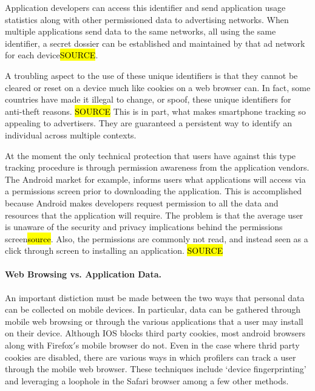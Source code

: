 Application developers can access this identifier and send application usage statistics along with other permissioned data to advertising networks. When multiple applications send data to the same networks, all using the same identifier, a secret dossier can be established and maintained by that ad network for each device\hl{SOURCE}.

A troubling aspect to the use of these unique identifiers is that they cannot be cleared or reset on a device much like cookies on a web browser can. In fact, some countries have made it illegal to change, or spoof, these unique identifiers for anti-theft reasons. \hl{SOURCE} This is in part, what makes smartphone tracking so appealing to advertisers. They are guaranteed a persistent way to identify an individual across multiple contexts.

At the moment the only technical protection that users have against this type tracking procedure is through permission awareness from the application vendors. The Android market for example, informs users what applications will access via a permissions screen prior to downloading the application. This is accomplished because Android makes developers request permission to all the data and resources that the application will require. The problem is that the average user is unaware of the security and privacy implications behind the permissions screen\hl{source}. Also, the permissions are commonly not read, and instead seen as a click through screen to installing an application. \hl{SOURCE}  

\paragraph{Web Browsing vs. Application Data.}
An important distiction must be made between the two ways that personal data can be collected on mobile devices. In particular, data can be gathered through mobile web browsing or through the various applications that a user may install on their device. Although IOS blocks third party cookies, most android browsers along with Firefox$'$s mobile browser do not\cite{Trust2013b}.  Even in the case where thrid party cookies are disabled, there are various ways in which profilers can track a user through the mobile web browser. These techniques include `device fingerprinting'\cite{Eff2010} and leveraging a loophole in the Safari browser \cite{John2012} among a few other methods\cite{Trust2013b}. 


